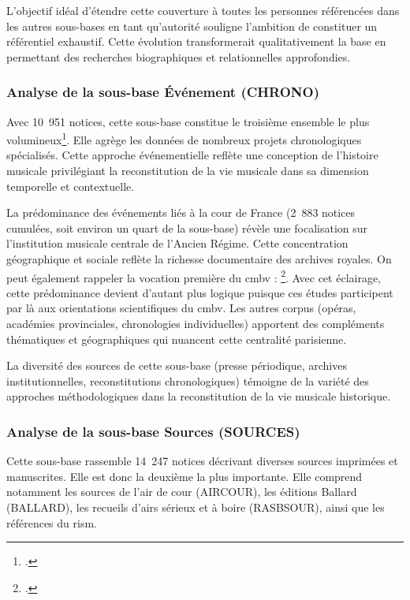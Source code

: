 L'objectif idéal d'étendre cette couverture à toutes les personnes référencées dans les autres sous-bases en tant qu'autorité souligne l'ambition de constituer un référentiel  exhaustif. Cette évolution transformerait qualitativement la base en permettant des recherches biographiques et relationnelles approfondies.

\subsubsection{Analyse de la sous-base Événement (CHRONO)}

Avec 10~951 notices, cette sous-base constitue le troisième ensemble le plus volumineux\footcite{BaseDonneesPHILIDOR42024}. Elle agrège les données de nombreux projets chronologiques spécialisés. Cette approche événementielle reflète une conception de l'histoire musicale privilégiant la reconstitution de la vie musicale dans sa dimension temporelle et contextuelle.

La prédominance des événements liés à la cour de France (2~883 notices cumulées, soit environ un quart de la sous-base) révèle une focalisation sur l'institution musicale centrale de l'Ancien Régime. Cette concentration géographique et sociale reflète la richesse documentaire des archives royales. On peut également rappeler la vocation première du \gls{cmbv} : \footcite{CentreMusiqueBaroque}. Avec cet éclairage, cette prédominance devient d'autant plus logique puisque ces études participent par là aux orientations scientifiques du \gls{cmbv}. Les autres corpus (opéras, académies provinciales, chronologies individuelles) apportent des compléments thématiques et géographiques qui nuancent cette centralité parisienne.

La diversité des sources de cette sous-base (presse périodique, archives institutionnelles, reconstitutions chronologiques) témoigne de la variété des approches méthodologiques dans la reconstitution de la vie musicale historique.

\subsubsection{Analyse de la sous-base Sources (SOURCES)}

Cette sous-base rassemble 14~247 notices décrivant diverses sources imprimées et manuscrites. Elle est donc la deuxième la plus importante. Elle comprend notamment les sources de l'air de cour (AIRCOUR), les éditions Ballard (BALLARD), les recueils d'airs sérieux et à boire (RASBSOUR), ainsi que les références du \gls{rism}.

